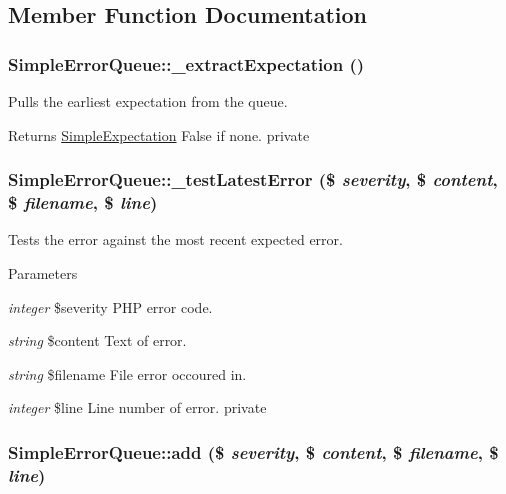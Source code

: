 \subsection{Member Function Documentation}
\hypertarget{class_simple_error_queue_a965965682c3d7774271034d100a3721f}{
\subsubsection[{\_\-extractExpectation}]{\setlength{\rightskip}{0pt plus 5cm}SimpleErrorQueue::\_\-extractExpectation ()}}
\label{class_simple_error_queue_a965965682c3d7774271034d100a3721f}
Pulls the earliest expectation from the queue. \begin{DoxyReturn}{Returns}
\hyperlink{class_simple_expectation}{SimpleExpectation} False if none.  private 
\end{DoxyReturn}
\hypertarget{class_simple_error_queue_a434a9249cf5f11f3450aa63ccb40e9dc}{
\subsubsection[{\_\-testLatestError}]{\setlength{\rightskip}{0pt plus 5cm}SimpleErrorQueue::\_\-testLatestError (\$ {\em severity}, \/  \$ {\em content}, \/  \$ {\em filename}, \/  \$ {\em line})}}
\label{class_simple_error_queue_a434a9249cf5f11f3450aa63ccb40e9dc}
Tests the error against the most recent expected error. 
\begin{DoxyParams}{Parameters}
\item[{\em integer}]\$severity PHP error code. \item[{\em string}]\$content Text of error. \item[{\em string}]\$filename File error occoured in. \item[{\em integer}]\$line Line number of error.  private \end{DoxyParams}
\hypertarget{class_simple_error_queue_adc13ee1f476b5ec158e3681fffa83421}{
\subsubsection[{add}]{\setlength{\rightskip}{0pt plus 5cm}SimpleErrorQueue::add (\$ {\em severity}, \/  \$ {\em content}, \/  \$ {\em filename}, \/  \$ {\em line})}}
